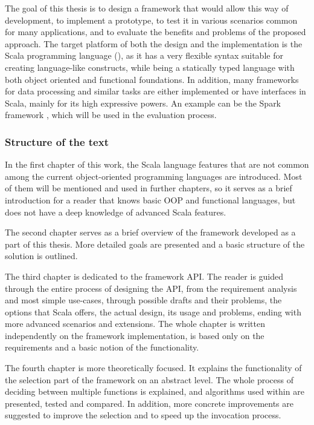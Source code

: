 The goal of this thesis is to design a framework that would allow this way of development, to implement a prototype, to test it in various scenarios common for many applications, and to evaluate the benefits and problems of the proposed approach. The target platform of both the design and the implementation is the Scala programming language (\cite{noauthor_scala_nodate}), as it has a very flexible syntax suitable for creating language-like constructs, while being a statically typed language with both object oriented and functional foundations. In addition, many frameworks for data processing and similar tasks are either implemented or have interfaces in Scala, mainly for its high expressive powers. An example can be the Spark framework \cite{noauthor_apache_nodate}, which will be used in the evaluation process.

\subsubsection{Structure of the text}

In the first chapter of this work, the Scala language features that are not common among the current object-oriented programming languages are introduced. Most of them will be mentioned and used in further chapters, so it serves as a brief introduction for a reader that knows basic OOP and functional languages, but does not have a deep knowledge of advanced Scala features.

The second chapter serves as a brief overview of the framework developed as a part of this thesis. More detailed goals are presented and a basic structure of the solution is outlined.

The third chapter is dedicated to the framework API. The reader is guided through the entire process of designing the API, from the requirement analysis and most simple use-cases, through possible drafts and their problems, the options that Scala offers, the actual design, its usage and problems, ending with more advanced scenarios and extensions. The whole chapter is written independently on the framework implementation, is based only on the requirements and a basic notion of the functionality.

The fourth chapter is more theoretically focused. It explains the functionality of the selection part of the framework on an abstract level. The whole process of deciding between multiple functions is explained, and algorithms used within are presented, tested and compared. In addition, more concrete improvements are suggested to improve the selection and to speed up the invocation process.


